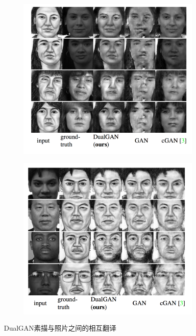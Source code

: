             \begin{figure}[H]
            \centering
            \begin{subfigure}[b]{0.4\textwidth}
            \includegraphics[width=\textwidth]{images/DualGAN_picture_translation1.jpg}
            \caption{}
            \end{subfigure}
            \begin{subfigure}[b]{0.4\textwidth}
            \includegraphics[width=\textwidth]{images/DualGAN_picture_translation2.jpg}
            \caption{}
            \end{subfigure}
            \caption{DualGAN素描与照片之间的相互翻译}
            \label{fig:DualGAN素描与照片之间的相互翻译}
            \end{figure}


